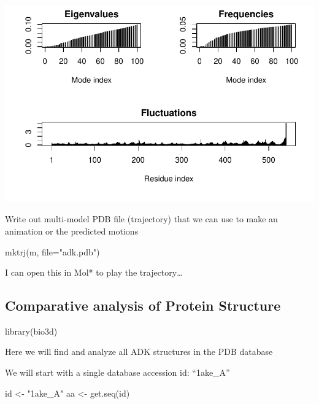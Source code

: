 \documentclass[
  letterpaper,
  DIV=11,
  numbers=noendperiod]{scrartcl}
\newenvironment{Shaded}{\begin{snugshade}}{\end{snugshade}}
\newcommand{\AttributeTok}[1]{\textcolor[rgb]{0.40,0.45,0.13}{#1}}
\newcommand{\FunctionTok}[1]{\textcolor[rgb]{0.28,0.35,0.67}{#1}}
\newcommand{\NormalTok}[1]{\textcolor[rgb]{0.00,0.23,0.31}{#1}}
\newcommand{\OtherTok}[1]{\textcolor[rgb]{0.00,0.23,0.31}{#1}}
\newcommand{\StringTok}[1]{\textcolor[rgb]{0.13,0.47,0.30}{#1}}
\begin{document}
\includegraphics{BIMM143-Lab-9-final_files/figure-pdf/unnamed-chunk-18-1.pdf}

Write out multi-model PDB file (trajectory) that we can use to make an
animation or the predicted motions

\begin{Shaded}
\begin{Highlighting}[]
\FunctionTok{mktrj}\NormalTok{(m, }\AttributeTok{file=}\StringTok{"adk.pdb"}\NormalTok{)}
\end{Highlighting}
\end{Shaded}

I can open this in Mol* to play the trajectory\ldots{}

\subsection{Comparative analysis of Protein
Structure}\label{comparative-analysis-of-protein-structure}

\begin{Shaded}
\begin{Highlighting}[]
\FunctionTok{library}\NormalTok{(bio3d)}
\end{Highlighting}
\end{Shaded}

Here we will find and analyze all ADK structures in the PDB database

We will start with a single database accession id: ``1ake\_A''

\begin{Shaded}
\begin{Highlighting}[]
\NormalTok{id }\OtherTok{\textless{}{-}} \StringTok{"1ake\_A"}
\NormalTok{aa }\OtherTok{\textless{}{-}} \FunctionTok{get.seq}\NormalTok{(id)}
\end{Highlighting}
\end{Shaded}
\end{document}
